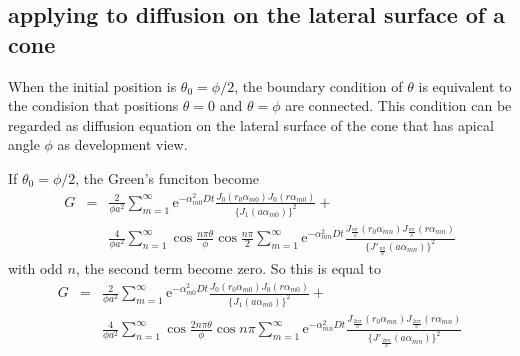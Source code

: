 \documentclass{article}
\begin{document}
\subsection{applying to diffusion on the lateral surface of a cone}
\label{sec:applying-surface-of-cone}

When the initial position is $\theta_0 = \phi / 2$, the boundary condition
of $\theta$ is equivalent to the condision that positions $\theta = 0$ and
$\theta = \phi$ are connected. This condition can be regarded as diffusion
equation on the lateral surface of the cone that has apical angle $\phi$ 
as development view.

If $\theta_0 = \phi / 2$, the Green's funciton become
\begin{eqnarray}
    G &=& \frac{2}{\phi a^2} \sum^{\infty}_{m=1}
          \mathrm{e}^{-\alpha_{m0}^2Dt}
          \frac{J_0(r_0\alpha_{m0})
                J_0(r\alpha_{m0})}
               {\{J_1(a\alpha_{m0})\}^2}+\nonumber\\
      & & \frac{4}{\phi a^2}\sum^{\infty}_{n=1}
          \cos\frac{n\pi\theta}{\phi}\cos\frac{n\pi}{2}
          \sum^{\infty}_{m=1}
          \mathrm{e}^{-\alpha_{mn}^2Dt}
          \frac{J_{\frac{n\pi}{\phi}}(r_0\alpha_{mn})
                J_{\frac{n\pi}{\phi}}(r\alpha_{mn})}
               {\{J'_{\frac{n\pi}{\phi}}(a\alpha_{mn})\}^2}
\end{eqnarray}
with odd $n$, the second term become zero. So this is equal to
\begin{eqnarray}
    G &=& \frac{2}{\phi a^2} \sum^{\infty}_{m=1}
          \mathrm{e}^{-\alpha_{m0}^2Dt}
          \frac{J_0(r_0\alpha_{m0})
                J_0(r\alpha_{m0})}
               {\{J_1(a\alpha_{m0})\}^2}+\nonumber\\
      & & \frac{4}{\phi a^2}\sum^{\infty}_{n=1}
          \cos\frac{2n\pi\theta}{\phi}\cos n\pi
          \sum^{\infty}_{m=1}
          \mathrm{e}^{-\alpha_{mn}^2Dt}
          \frac{J_{\frac{2n\pi}{\phi}}(r_0\alpha_{mn})
                J_{\frac{2n\pi}{\phi}}(r\alpha_{mn})}
               {\{J'_{\frac{2n\pi}{\phi}}(a\alpha_{mn})\}^2}
\end{eqnarray}
\end{document}
